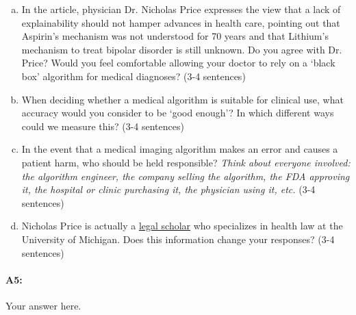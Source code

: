 \begin{enumerate}[(a)]
    \item
          In the article, physician Dr. Nicholas Price expresses the view that a lack of explainability should not hamper advances in health care, pointing out that Aspirin’s mechanism was not understood for 70 years and that Lithium’s mechanism to treat bipolar disorder is still unknown. Do you agree with Dr. Price? Would you feel comfortable allowing your doctor to rely on a ‘black box’ algorithm for medical diagnoses? (3-4 sentences)
    \item
          When deciding whether a medical algorithm is suitable for clinical use, what accuracy would you consider to be ‘good enough’? In which different ways could we measure this? (3-4 sentences)
    \item
          In the event that a medical imaging algorithm makes an error and causes a patient harm, who should be held responsible? \textit{Think about everyone involved: the algorithm engineer, the company selling the algorithm, the FDA approving it, the hospital or clinic purchasing it, the physician using it, etc.} (3-4 sentences)
    \item
          Nicholas Price is actually a \href{https://drive.google.com/file/d/1bDAqEtW482OJeqMBt5A4AradVa4gf_o9/view}{legal scholar} who specializes in health law at the University of Michigan. Does this information change your responses? (3-4 sentences)

\end{enumerate}

\paragraph{A5:} Your answer here.

